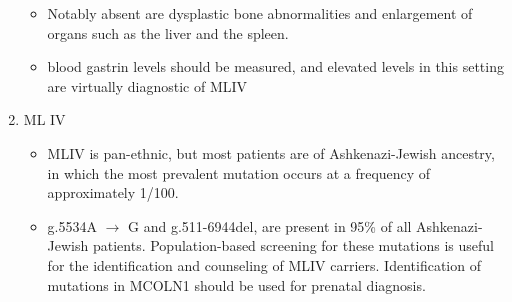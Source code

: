 \documentclass{scrartcl}
\begin{document}
\begin{enumerate}
\begin{itemize}
\item Notably absent are dysplastic bone abnormalities and enlargement of
organs such as the liver and the spleen.

\item blood gastrin levels should be measured, and elevated levels in
this setting are virtually diagnostic of MLIV
\end{itemize}

\item ML IV
\label{sec:orgb7d5d8d}

\begin{itemize}
\item MLIV is pan-ethnic, but most patients are of Ashkenazi-Jewish
ancestry, in which the most prevalent mutation occurs at a frequency
of approximately 1/100.

\item g.5534A \(\to\) G and g.511-6944del, are present in 95\% of all
Ashkenazi-Jewish patients. Population-based screening for these
mutations is useful for the identification and counseling of MLIV
carriers. Identification of mutations in MCOLN1 should be used for
prenatal diagnosis.
\end{itemize}
\end{enumerate}
\end{document}
